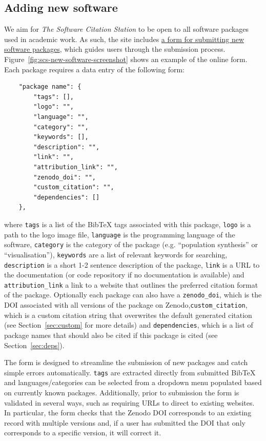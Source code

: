 \documentclass[twocolumn,linenumbers]{aastex631}
\newcommand{\site}{\textit{The Software Citation Station}\xspace}
\begin{document}
\subsection{Adding new software}\label{sec:new_software}
We aim for \site to be open to all software packages used in academic work. As such, the site includes \href{https://www.tomwagg.com/software-citation-station/?new-software=true}{a form for submitting new software packages}, which guides users through the submission process. Figure~\ref{fig:scs-new-software-screenshot} shows an example of the online form. Each package requires a data entry of the following form:
\begin{verbatim}
    "package name": {
        "tags": [],
        "logo": "",
        "language": "",
        "category": "",
        "keywords": [],
        "description": "",
        "link": "",
        "attribution_link": "",
        "zenodo_doi": "",
        "custom_citation": "",
        "dependencies": []
    },
\end{verbatim}
where \texttt{tags} is a list of the BibTeX tags associated with this package, \texttt{logo} is a path to the logo image file, \texttt{language} is the programming language of the software, \texttt{category} is the category of the package (e.g. ``population synthesis'' or ``visualisation''), \texttt{keywords} are a list of relevant keywords for searching, \texttt{description} is a short 1-2 sentence description of the package, \texttt{link} is a URL to the documentation (or code repository if no documentation is available) and \texttt{attribution\_link} a link to a website that outlines the preferred citation format of the package. Optionally each package can also have a \texttt{zenodo\_doi}, which is the DOI associated with all versions of the package on Zenodo,\texttt{custom\_citation}, which is a custom citation string that overwrites the default generated citation (see Section~\ref{sec:custom} for more details) and \texttt{dependencies}, which is a list of package names that should also be cited if this package is cited (see Section~\ref{sec:deps}).

The form is designed to streamline the submission of new packages and catch simple errors automatically. \texttt{tags} are extracted directly from submitted BibTeX and languages/categories can be selected from a dropdown menu populated based on currently known packages. Additionally, prior to submission the form is validated in several ways, such as requiring URLs to direct to existing websites. In particular, the form checks that the Zenodo DOI corresponds to an existing record with multiple versions and, if a user has submitted the DOI that only corresponds to a specific version, it will correct it. 
\end{document}
